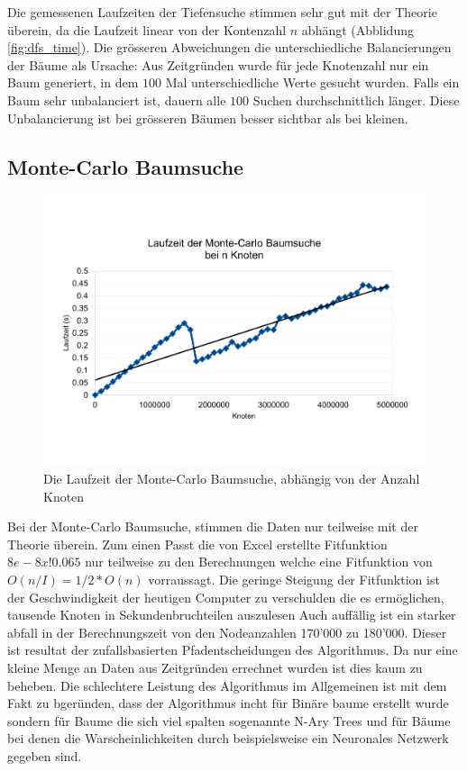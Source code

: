 \documentclass[a4paper,11pt]{article}
\begin{document}
Die gemessenen Laufzeiten der Tiefensuche stimmen sehr gut mit der Theorie überein, da die Laufzeit linear von der Kontenzahl $n$ abhängt (Abblidung \ref{fig:dfs_time}). Die grösseren Abweichungen die unterschiedliche Balancierungen der Bäume als Ursache: Aus Zeitgründen wurde für jede Knotenzahl nur ein Baum generiert, in dem $100$ Mal unterschiedliche Werte gesucht wurden. Falls ein Baum sehr unbalanciert ist, dauern alle $100$ Suchen durchschnittlich länger. Diese Unbalancierung ist bei grösseren Bäumen besser sichtbar als bei kleinen.

\subsection{Monte-Carlo Baumsuche}

	\begin{figure}[ht]
		\centering
		\includegraphics[width=0.85\linewidth]{img/MCTS_size.pdf}
		\caption{Die Laufzeit der Monte-Carlo Baumsuche, abhängig von der Anzahl Knoten}
		\label{fig:mcts_time}
	\end{figure}
Bei der Monte-Carlo Baumsuche, stimmen die Daten nur teilweise mit der Theorie überein. Zum einen Passt die von Excel erstellte Fitfunktion $ 8e-8x!0.065$ nur teilweise zu den Berechnungen welche eine Fitfunktion von $O(n/I) = 1/2*O(n)$  vorraussagt. Die geringe Steigung der Fitfunktion ist der Geschwindigkeit der heutigen Computer zu verschulden die es ermöglichen, tausende Knoten in Sekundenbruchteilen auszulesen Auch auffällig ist ein starker abfall in der Berechnungszeit von den Nodeanzahlen 170'000 zu 180'000. Dieser ist resultat der zufallsbasierten Pfadentscheidungen des Algorithmus. Da nur eine kleine Menge an Daten aus Zeitgründen errechnet wurden ist dies kaum zu beheben. Die schlechtere Leistung des Algorithmus im Allgemeinen ist mit dem Fakt zu bgeründen, dass der Algorithmus incht für Binäre baume erstellt wurde sondern für Baume die sich viel spalten sogenannte N-Ary Trees und für Bäume bei denen die Warscheinlichkeiten durch beispielsweise ein Neuronales Netzwerk gegeben sind.
\end{document}
